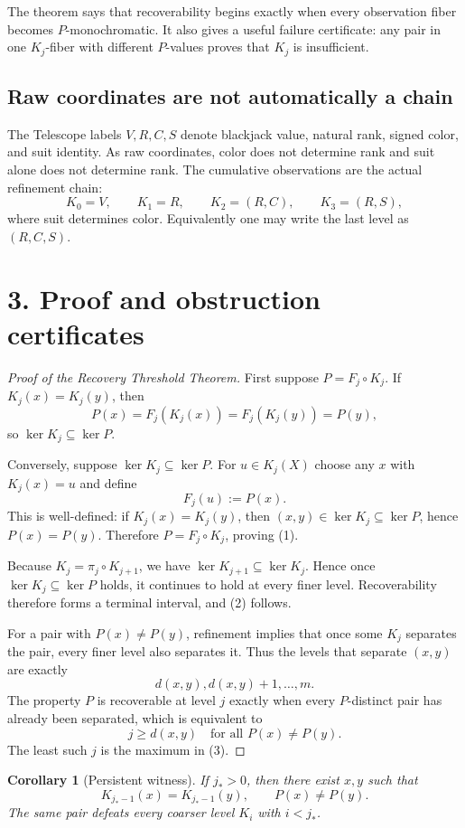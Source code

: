 \documentclass[9pt]{extarticle}
\theoremstyle{cgplain}
\newtheorem{corollary}{Corollary}
\theoremstyle{definition}
\begin{document}
The theorem says that recoverability begins exactly when every observation fiber becomes $P$-monochromatic. It also gives a useful failure certificate: any pair in one $K_j$-fiber with different $P$-values proves that $K_j$ is insufficient.

\subsection*{Raw coordinates are not automatically a chain}
The Telescope labels $V,R,C,S$ denote blackjack value, natural rank, signed color, and suit identity. As raw coordinates, color does not determine rank and suit alone does not determine rank. The cumulative observations are the actual refinement chain:
\[
\boxed{
K_0=V,\qquad
K_1=R,\qquad
K_2=(R,C),\qquad
K_3=(R,S),
}
\tag{4}
\]
where suit determines color. Equivalently one may write the last level as $(R,C,S)$.

\section*{3. Proof and obstruction certificates}
\begin{proof}[Proof of the Recovery Threshold Theorem]
First suppose $P=F_j\circ K_j$. If $K_j(x)=K_j(y)$, then
\[
P(x)=F_j(K_j(x))=F_j(K_j(y))=P(y),
\]
so $\ker K_j\subseteq\ker P$.

Conversely, suppose $\ker K_j\subseteq\ker P$. For $u\in K_j(X)$ choose any $x$ with $K_j(x)=u$ and define
\[
F_j(u):=P(x).
\]
This is well-defined: if $K_j(x)=K_j(y)$, then $(x,y)\in\ker K_j\subseteq\ker P$, hence $P(x)=P(y)$. Therefore $P=F_j\circ K_j$, proving (1).

Because $K_j=\pi_j\circ K_{j+1}$, we have $\ker K_{j+1}\subseteq\ker K_j$. Hence once $\ker K_j\subseteq\ker P$ holds, it continues to hold at every finer level. Recoverability therefore forms a terminal interval, and (2) follows.

For a pair with $P(x)\neq P(y)$, refinement implies that once some $K_j$ separates the pair, every finer level also separates it. Thus the levels that separate $(x,y)$ are exactly
\[
d(x,y),d(x,y)+1,\ldots,m.
\]
The property $P$ is recoverable at level $j$ exactly when every $P$-distinct pair has already been separated, which is equivalent to
\[
j\ge d(x,y)\quad\text{for all }P(x)\neq P(y).
\]
The least such $j$ is the maximum in (3).
\end{proof}

\begin{corollary}[Persistent witness]
If $j_*>0$, then there exist $x,y$ such that
\[
K_{j_*-1}(x)=K_{j_*-1}(y),\qquad P(x)\neq P(y).
\]
The same pair defeats every coarser level $K_i$ with $i<j_*$.
\end{corollary}
\end{document}
